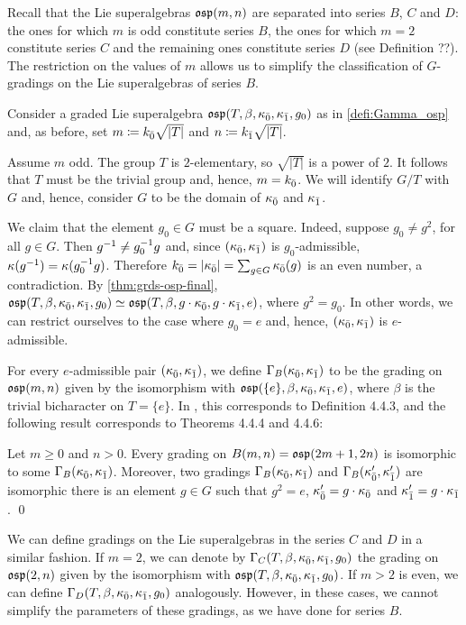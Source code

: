 Recall that the Lie superalgebras $\mathfrak{osp}(m,n)$ are separated into series $B$, $C$ and $D$: the ones for which $m$ is odd constitute series $B$, the ones for which $m = 2$ constitute series $C$ and the remaining ones constitute series $D$ (see Definition ??). 
The restriction on the values of $m$ allows us to simplify the classification of $G$-gradings on the Lie superalgebras of series $B$. 

Consider a graded Lie superalgebra $\mathfrak{osp}(T, \beta, \kappa_{\bar{0}}, \kappa_{\bar{1}}, g_0)$ as in \cref{defi:Gamma_osp} and, as before, set $m \coloneqq k_{\bar{0}} \sqrt{|T|}$ and $n \coloneqq k_{\bar{1}} \sqrt{|T|}$. 

Assume $m$ odd. 
The group $T$ is  $2$-elementary, so $\sqrt{|T|}$ is a power of $2$. 
It follows that $T$ must be the trivial group and, hence, $ m = k_{\bar{0}}$. 
We will identify $G/T$ with $G$ and, hence, consider $G$ to be the domain of $\kappa_{\bar{0}}$ and $\kappa_{\bar{1}}$. 

We claim that the element $g_0 \in G$ must be a square. 
Indeed, suppose $g_0 \neq g^2$, for all $g\in G$. 
Then $g^{-1} \neq g_0^{-1} g$ and, since $(\kappa_{\bar{0}}, \kappa_{\bar{1}})$ is $g_0$-admissible, $\kappa(g^{-1}) = \kappa(g_0^{-1} g)$. 
Therefore $k_{\bar{0}} = |\kappa_{\bar{0}}| = \sum_{g \in G} \kappa_{\bar{0}}(g)$ is an even number, a contradiction. 
By \cref{thm:grds-osp-final}, $\mathfrak{osp}(T, \beta, \kappa_{\bar{0}}, \kappa_{\bar{1}}, g_0) \simeq \mathfrak{osp}(T, \beta, g\cdot \kappa_{\bar{0}}, g\cdot \kappa_{\bar{1}}, e)$, where $g^2 = g_0$. 
In other words, we can restrict ourselves to the case where $g_0 = e$ and, hence, $(\kappa_{\bar{0}}, \kappa_{\bar{1}})$ is $e$-admissible.

For every $e$-admissible pair $(\kappa_{\bar{0}}, \kappa_{\bar{1}})$, we define $\Gamma_B(\kappa_{\bar{0}}, \kappa_{\bar{1}})$ to be the grading on $\mathfrak{osp}(m,n)$ given by the isomorphism with $\mathfrak{osp}(\{e\}, \beta, \kappa_{\bar{0}}, \kappa_{\bar{1}}, e)$, where $\beta$ is the trivial bicharacter on $T = \{e\}$. 
In \cite{Helens_thesis}, this corresponds to Definition 4.4.3, and the following result corresponds to Theorems 4.4.4 and 4.4.6: 

\begin{cor}
    Let $m\geq 0$ and $n > 0$. 
    Every grading on $B(m,n) = \mathfrak{osp}(2m+1, 2n)$ is isomorphic to some $\Gamma_B (\kappa_{\bar{0}}, \kappa_{\bar{1}})$. 
    Moreover, two gradings $\Gamma_B (\kappa_{\bar{0}}, \kappa_{\bar{1}})$ and $\Gamma_B (\kappa_{\bar{0}}', \kappa_{\bar{1}}')$ are isomorphic \IFF there is an element $g \in G$ such that $g^2 = e$, $\kappa_{\bar{0}}' = g\cdot \kappa_{\bar{0}}$ and $\kappa_{\bar{1}}' = g\cdot \kappa_{\bar{1}}$. \qed
\end{cor}

We can define gradings on the Lie superalgebras in the series $C$ and $D$ in a similar fashion. 
If $m = 2$, we can denote by $\Gamma_C (T, \beta, \kappa_{\bar{0}}, \kappa_{\bar{1}}, g_0)$ the grading on $\mathfrak{osp} (2,n)$ given by the isomorphism with $\mathfrak{osp}(T, \beta, \kappa_{\bar{0}}, \kappa_{\bar{1}}, g_0)$. 
If $m > 2$ is even, we can define $\Gamma_D (T, \beta, \kappa_{\bar{0}}, \kappa_{\bar{1}}, g_0)$ analogously. 
However, in these cases, we cannot simplify the parameters of these gradings, as we have done for series $B$. 
